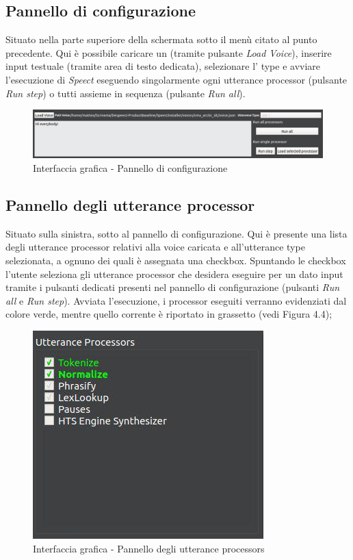 \documentclass[openany,12pt,a4paper]{report}
\begin{document}
 	\subsection{Pannello di configurazione}
 	Situato nella parte superiore della schermata sotto il menù citato al punto precedente. Qui è possibile caricare un  (tramite pulsante \textit{Load Voice}), inserire input testuale (tramite area di testo dedicata), selezionare l' type e avviare l'esecuzione di \textit{Speect} eseguendo singolarmente ogni utterance processor (pulsante \textit{Run step}) o tutti assieme in sequenza (pulsante \textit{Run all}).
 		\begin{figure}[H]
 			
 			\centering
 			
 			\includegraphics[width=\textwidth]{./img/pannello_configurazione}
 			
 			\caption{Interfaccia grafica - Pannello di configurazione}
 			
 		\end{figure}
 	
 	\subsection{Pannello degli utterance processor}
 	Situato sulla sinistra, sotto al pannello di configurazione. Qui è presente una lista degli utterance processor relativi alla voice caricata e all'utterance type selezionata, a ognuno dei quali è assegnata una checkbox. Spuntando le checkbox l'utente seleziona gli utterance processor che desidera eseguire per un dato input tramite i pulsanti dedicati presenti nel pannello di configurazione (pulsanti \textit{Run all} e \textit{Run step}). Avviata l'esecuzione, i processor eseguiti verranno evidenziati dal colore verde, mentre quello corrente è riportato in grassetto (vedi Figura 4.4);
 		\begin{figure}[H]
 			
 			\centering
 			
 				\includegraphics[width=.4\textwidth]{./img/pannello_processors}
 			
 			\caption{Interfaccia grafica - Pannello degli utterance processors}
 			
 		\end{figure}
 		
\end{document}

